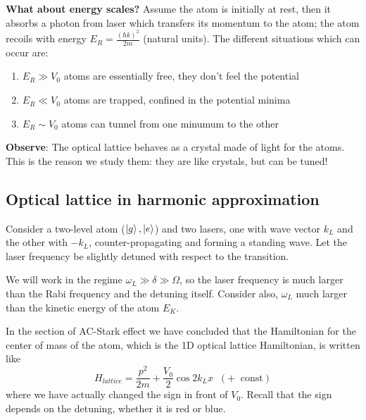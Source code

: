 \begin{center} \scalebox{1.5}{
    
} \end{center}

\textbf{What about energy scales?} Assume the atom is initially at rest, then it absorbs a photon from laser which transfers its momentum to the atom; the atom recoils with energy $E_R = \frac{(\hbar k)^2}{2m}$ (natural units). The different situations which can occur are:
\begin{enumerate}
    \item $E_R \gg V_0$ atoms are essentially free, they don't feel the potential
    \item $E_R \ll V_0$ atoms are trapped, confined in the potential minima
    \item $E_R \sim V_0$ atoms can tunnel from one minumum to the other
\end{enumerate}

\textbf{Observe}: The optical lattice behaves as a crystal made of light for the atoms. This is the reason we study them: they are like crystals, but can be tuned!




\vspace{1cm}











\subsection{Optical lattice in harmonic approximation}

\begin{center}
    
\end{center}

Consider a two-level atom ($\ket{g}, \ket{e}$) and two lasers, one with wave vector $k_L$ and the other with $-k_L$, counter-propagating and forming a standing wave.
Let the laser frequency be slightly detuned with respect to the transition.

\noindent We will work in the regime $\omega_L \gg \delta \gg \Omega$, so the laser frequency is much larger than the Rabi frequency and the detuning itself.
Consider also, $\omega_L$ much larger than the kinetic energy of the atom $E_K$.

In the section of AC-Stark effect we have concluded that the Hamiltonian for the center of mass of the atom, which is the 1D optical lattice Hamiltonian, is written like
\begin{equation*}
H_{lattice} =  \frac{p^2}{2m} +
    \frac{V_0}{2}\cos{2k_Lx} \;\;
    (+\;\; \text{const}) 
\end{equation*}
where we have actually changed the sign in front of $V_0$. Recall that the sign depends on the detuning, whether it is red or blue.


